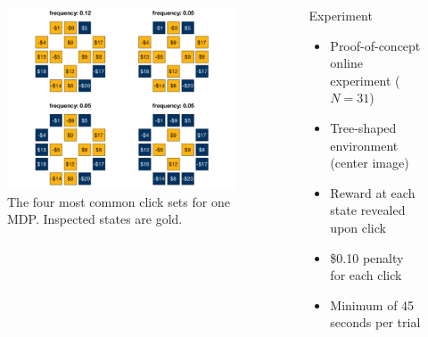 \documentclass[final]{beamer}
\newlength{\sepwid}
\newlength{\onecolwid}
\newlength{\twocolwid}
\begin{document}
\begin{frame}[t, fragile]
\begin{columns}[t]
\begin{column}{\twocolwid}
\begin{columns}[t,totalwidth=\twocolwid]
\begin{column}{\onecolwid}
        \begin{figure}
          \centering
          \label{fig:click_sets}
          \includegraphics[width=0.9\linewidth]{figs/click_sets_trial4_noFB_small.png}
          \captionsetup{width=0.9\linewidth}
          \caption{The four most common click sets for one MDP. Inspected states are gold.}
        \end{figure}
    
    \end{column} %

  \end{columns}

\end{column} %
\begin{column}{\sepwid}\end{column} %
\begin{column}{\onecolwid} %

  \begin{block}{Experiment}\label{experiment}
    \begin{itemize}
      \item Proof-of-concept online experiment ($N=31$)
      \item Tree-shaped environment (center image)
      \item Reward at each state revealed upon click
      \item \$0.10 penalty for each click
      \item Minimum of 45 seconds per trial
    \end{itemize}
  \end{block}


\end{column}
\end{columns}
\end{frame}
\end{document}
